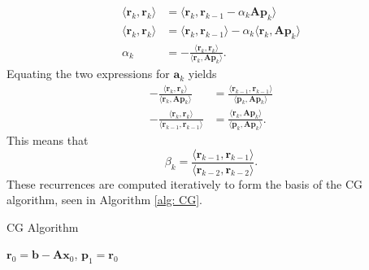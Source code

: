 \begin{align*}
    \langle \bm{r}_k , \bm{r}_k \rangle & = \langle \bm{r}_k , \bm{r}_{k-1} - \alpha_k \bm{A} \bm{p}_k \rangle                            \\
    \langle \bm{r}_k , \bm{r}_k \rangle & = \langle \bm{r}_k , \bm{r}_{k-1} \rangle - \alpha_k \langle \bm{r}_k , \bm{A} \bm{p}_k \rangle \\
    \alpha_k                            & = - \frac{\langle \bm{r}_k , \bm{r}_k \rangle}{\langle \bm{r}_k , \bm{A} \bm{p}_k \rangle}.
\end{align*}
Equating the two expressions for $\bm{a}_k$ yields
\begin{align*}
    - \frac{\langle \bm{r}_k , \bm{r}_k \rangle}{\langle \bm{r}_k , \bm{A} \bm{p}_k \rangle}  & = \frac{\langle \bm{r}_{k-1} , \bm{r}_{k-1} \rangle}{\langle \bm{p}_k, \bm{A} \bm{p}_k \rangle} \\
    - \frac{\langle \bm{r}_k , \bm{r}_k \rangle}{\langle \bm{r}_{k-1} , \bm{r}_{k-1} \rangle} & = \frac{\langle \bm{r}_k , \bm{A} \bm{p}_k \rangle}{\langle \bm{p}_k, \bm{A} \bm{p}_k \rangle}.
\end{align*}
This means that
\[
    \beta_k = \frac{\langle \bm{r}_{k-1} , \bm{r}_{k-1} \rangle}{\langle \bm{r}_{k-2} , \bm{r}_{k-2} \rangle}.
\]
These recurrences are computed iteratively to form the basis of the CG algorithm, seen in Algorithm \ref{alg: CG}.

{\centering
\begin{minipage}{.85\linewidth}
    \begin{algorithm}[H]
        \caption{CG Algorithm}
        \label{alg: CG}
        \SetAlgoLined
        \DontPrintSemicolon

        \BlankLine
        $\bm{r}_0 = \bm{b} - \bm{A} \bm{x}_0$, $\bm{p}_1 = \bm{r}_0$\;
        \BlankLine
    \end{algorithm}
\end{minipage}
\par
}
